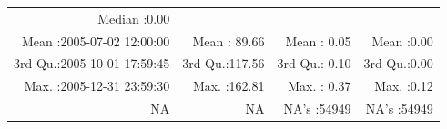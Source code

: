 \documentclass[
  10pt,
  a4paper,oneside]{article}
\begin{document}
\begin{longtable}[]{@{}rrrr@{}}
\begin{minipage}[t]{0.18\columnwidth}
Median :0.00\strut
\end{minipage}\tabularnewline
\begin{minipage}[t]{0.34\columnwidth}\raggedleft
Mean :2005-07-02 12:00:00\strut
\end{minipage} & \begin{minipage}[t]{0.19\columnwidth}\raggedleft
Mean : 89.66\strut
\end{minipage} & \begin{minipage}[t]{0.18\columnwidth}\raggedleft
Mean : 0.05\strut
\end{minipage} & \begin{minipage}[t]{0.18\columnwidth}\raggedleft
Mean :0.00\strut
\end{minipage}\tabularnewline
\begin{minipage}[t]{0.34\columnwidth}\raggedleft
3rd Qu.:2005-10-01 17:59:45\strut
\end{minipage} & \begin{minipage}[t]{0.19\columnwidth}\raggedleft
3rd Qu.:117.56\strut
\end{minipage} & \begin{minipage}[t]{0.18\columnwidth}\raggedleft
3rd Qu.: 0.10\strut
\end{minipage} & \begin{minipage}[t]{0.18\columnwidth}\raggedleft
3rd Qu.:0.00\strut
\end{minipage}\tabularnewline
\begin{minipage}[t]{0.34\columnwidth}\raggedleft
Max. :2005-12-31 23:59:30\strut
\end{minipage} & \begin{minipage}[t]{0.19\columnwidth}\raggedleft
Max. :162.81\strut
\end{minipage} & \begin{minipage}[t]{0.18\columnwidth}\raggedleft
Max. : 0.37\strut
\end{minipage} & \begin{minipage}[t]{0.18\columnwidth}\raggedleft
Max. :0.12\strut
\end{minipage}\tabularnewline
\begin{minipage}[t]{0.34\columnwidth}\raggedleft
NA\strut
\end{minipage} & \begin{minipage}[t]{0.19\columnwidth}\raggedleft
NA\strut
\end{minipage} & \begin{minipage}[t]{0.18\columnwidth}\raggedleft
NA's :54949\strut
\end{minipage} & \begin{minipage}[t]{0.18\columnwidth}\raggedleft
NA's :54949\strut
\end{minipage}\tabularnewline
\bottomrule
\end{longtable}
\end{document}
